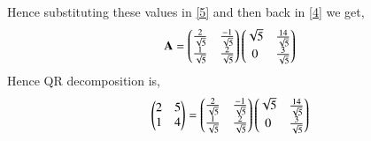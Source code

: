\documentclass[journal,12pt,twocolumn]{IEEEtran}
\begin{document}
Hence substituting these values in \eqref{5} and then back in \eqref{4} we get,
\begin{align}
\mathbf{A}= \begin{pmatrix}\frac{2}{\sqrt{5}}&\frac{-1}{\sqrt{5}}\\\frac{1}{\sqrt{5}}&\frac{2}{\sqrt{5}}\end{pmatrix}\begin{pmatrix}\sqrt{5}&\frac{14}{\sqrt{5}}\\0&\frac{3}{\sqrt{5}}\end{pmatrix}
\end{align}
Hence QR decomposition is,
\begin{align}
\begin{pmatrix}2&5\\1&4\end{pmatrix}=\begin{pmatrix}\frac{2}{\sqrt{5}}&\frac{-1}{\sqrt{5}}\\\frac{1}{\sqrt{5}}&\frac{2}{\sqrt{5}}\end{pmatrix}\begin{pmatrix}\sqrt{5}&\frac{14}{\sqrt{5}}\\0&\frac{3}{\sqrt{5}}\end{pmatrix}
\end{align}
\end{document}
